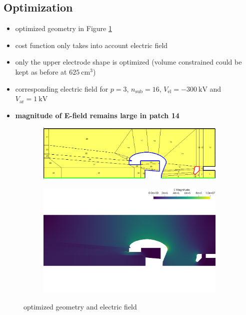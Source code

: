 \subsection{Optimization}
\begin{itemize}
   \item optimized geometry in Figure \ref{fig:opt}
   \item cost function only takes into account electric field
   \item only the upper electrode shape is optimized (volume constrained could be kept as before at $625\ \mathrm{cm}^3$)
   \item corresponding electric field for $p=3$, $n_\mathrm{sub}=16$,  $V_\mathrm{el}=-300\ \mathrm{kV}$ and $V_\mathrm{ar}=1\ \mathrm{kV}$
   \item \textbf{magnitude of E-field remains large in patch 14}
\end{itemize}

\begin{center}
\begin{figure}[H]
   \begin{subfigure}{0.45\textwidth}
      \includegraphics[width=\textwidth]{fig/geometry_v6_opt_order=3_run1}
   \end{subfigure}
   \begin{subfigure}{0.45\textwidth}
      \includegraphics[width=\textwidth]{fig/E_v6_opt_order=3_run1}
   \end{subfigure}
   \caption{optimized geometry and electric field}
   \label{fig:opt}
\end{figure}
\end{center}

